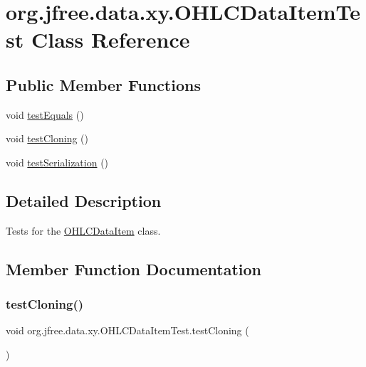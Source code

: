 \hypertarget{classorg_1_1jfree_1_1data_1_1xy_1_1_o_h_l_c_data_item_test}{}\section{org.\+jfree.\+data.\+xy.\+O\+H\+L\+C\+Data\+Item\+Test Class Reference}
\label{classorg_1_1jfree_1_1data_1_1xy_1_1_o_h_l_c_data_item_test}
\subsection*{Public Member Functions}
\begin{DoxyCompactItemize}
\item 
void \mbox{\hyperlink{classorg_1_1jfree_1_1data_1_1xy_1_1_o_h_l_c_data_item_test_af58d1258c85be018743608c0a220336b}{test\+Equals}} ()
\item 
void \mbox{\hyperlink{classorg_1_1jfree_1_1data_1_1xy_1_1_o_h_l_c_data_item_test_af946cc677a0c92a8b15f99a70503e923}{test\+Cloning}} ()
\item 
void \mbox{\hyperlink{classorg_1_1jfree_1_1data_1_1xy_1_1_o_h_l_c_data_item_test_ac3c9dc1886be8527613a229e61f14721}{test\+Serialization}} ()
\end{DoxyCompactItemize}


\subsection{Detailed Description}
Tests for the \mbox{\hyperlink{classorg_1_1jfree_1_1data_1_1xy_1_1_o_h_l_c_data_item}{O\+H\+L\+C\+Data\+Item}} class. 

\subsection{Member Function Documentation}
\mbox{\label{classorg_1_1jfree_1_1data_1_1xy_1_1_o_h_l_c_data_item_test_af946cc677a0c92a8b15f99a70503e923}} 
\subsubsection{\texorpdfstring{test\+Cloning()}{testCloning()}}
{\footnotesize\ttfamily void org.\+jfree.\+data.\+xy.\+O\+H\+L\+C\+Data\+Item\+Test.\+test\+Cloning (\begin{DoxyParamCaption}{ }\end{DoxyParamCaption})}

